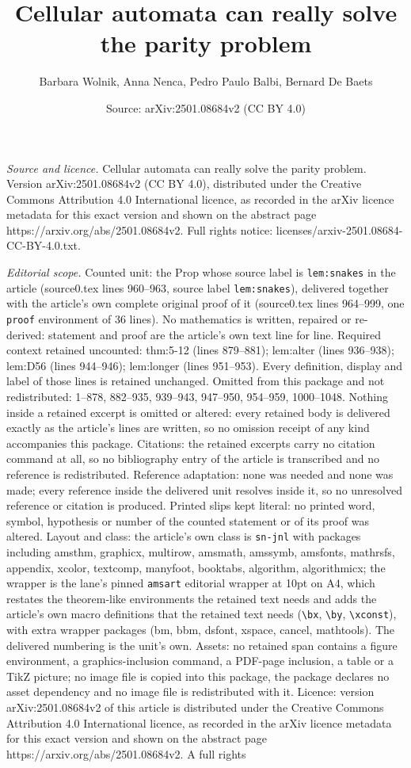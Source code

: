 \documentclass[10pt,a4paper]{amsart}
\title[Cellular automata can really solve the parity problem]{Cellular automata can really solve the parity problem}
\author{Barbara Wolnik, Anna Nenca, Pedro Paulo Balbi, Bernard De Baets}
\date{Source: arXiv:2501.08684v2 (CC BY 4.0)}
\begin{document}
\maketitle

\noindent\emph{Source and licence.} Cellular automata can really solve the parity problem. Version arXiv:2501.08684v2 (CC BY 4.0), distributed under the Creative Commons Attribution 4.0 International licence, as recorded in the arXiv licence metadata for this exact version and shown on the abstract page https://arxiv.org/abs/2501.08684v2. Full rights notice: licenses/arxiv-2501.08684-CC-BY-4.0.txt.\par\smallskip

\noindent\textit{Editorial scope.} Counted unit: the Prop whose source label is \texttt{lem:snakes} in the article (source0.tex lines 960--963, source label \texttt{lem:snakes}), delivered together with the article's own complete original proof of it (source0.tex lines 964--999, one \texttt{proof} environment of 36 lines). No mathematics is written, repaired or re-derived: statement and proof are the article's own text line for line. Required context retained uncounted: thm:5-12 (lines 879--881); lem:alter (lines 936--938); lem:D56 (lines 944--946); lem:longer (lines 951--953). Every definition, display and label of those lines is retained unchanged. Omitted from this package and not redistributed: 1--878, 882--935, 939--943, 947--950, 954--959, 1000--1048. Nothing inside a retained excerpt is omitted or altered: every retained body is delivered exactly as the article's lines are written, so no omission receipt of any kind accompanies this package. Citations: the retained excerpts carry no citation command at all, so no bibliography entry of the article is transcribed and no reference is redistributed. Reference adaptation: none was needed and none was made; every reference inside the delivered unit resolves inside it, so no unresolved reference or citation is produced. Printed slips kept literal: no printed word, symbol, hypothesis or number of the counted statement or of its proof was altered. Layout and class: the article's own class is \texttt{sn-jnl} with packages including amsthm, graphicx, multirow, amsmath, amssymb, amsfonts, mathrsfs, appendix, xcolor, textcomp, manyfoot, booktabs, algorithm, algorithmicx; the wrapper is the lane's pinned \texttt{amsart} editorial wrapper at 10pt on A4, which restates the theorem-like environments the retained text needs and adds the article's own macro definitions that the retained text needs (\texttt{\textbackslash bx}, \texttt{\textbackslash by}, \texttt{\textbackslash xconst}), with extra wrapper packages (bm, bbm, dsfont, xspace, cancel, mathtools). The delivered numbering is the unit's own. Assets: no retained span contains a figure environment, a graphics-inclusion command, a PDF-page inclusion, a table or a TikZ picture; no image file is copied into this package, the package declares no asset dependency and no image file is redistributed with it. Licence: version arXiv:2501.08684v2 of this article is distributed under the Creative Commons Attribution 4.0 International licence, as recorded in the arXiv licence metadata for this exact version and shown on the abstract page https://arxiv.org/abs/2501.08684v2. A full rights 
\end{document}
